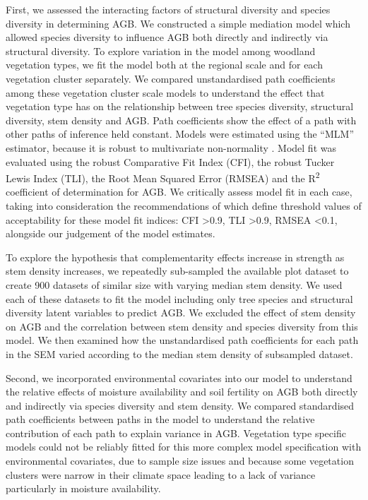 \documentclass[11pt,a4paper]{article}
\begin{document}
First, we assessed the interacting factors of structural diversity and species diversity in determining AGB. We constructed a simple mediation model which allowed species diversity to influence AGB both directly and indirectly via structural diversity. To explore variation in the model among woodland vegetation types, we fit the model both at the regional scale and for each vegetation cluster separately. We compared unstandardised path coefficients among these vegetation cluster scale models to understand the effect that vegetation type has on the relationship between tree species diversity, structural diversity, stem density and AGB. Path coefficients show the effect of a path with other paths of inference held constant. Models were estimated using the ``MLM'' estimator, because it is robust to multivariate non-normality \citep{Shapiro1983}. Model fit was evaluated using the robust Comparative Fit Index (CFI), the robust Tucker Lewis Index (TLI), the Root Mean Squared Error (RMSEA) and the R\textsuperscript{2} coefficient of determination for AGB. We critically assess model fit in each case, taking into consideration the recommendations of \citet{Hu1999} which define threshold values of acceptability for these model fit indices: CFI >0.9, TLI >0.9, RMSEA <0.1, alongside our judgement of the model estimates.

To explore the hypothesis that complementarity effects increase in strength as stem density increases, we repeatedly sub-sampled the available plot dataset to create 900 datasets of similar size with varying median stem density. We used each of these datasets to fit the model including only tree species and structural diversity latent variables to predict AGB. We excluded the effect of stem density on AGB and the correlation between stem density and species diversity from this model. We then examined how the unstandardised path coefficients for each path in the SEM varied according to the median stem density of subsampled dataset.

Second, we incorporated environmental covariates into our model to understand the relative effects of moisture availability and soil fertility on AGB both directly and indirectly via species diversity and stem density. We compared standardised path coefficients between paths in the model to understand the relative contribution of each path to explain variance in AGB. Vegetation type specific models could not be reliably fitted for this more complex model specification with environmental covariates, due to sample size issues and because some vegetation clusters were narrow in their climate space leading to a lack of variance particularly in moisture availability.
\end{document}
